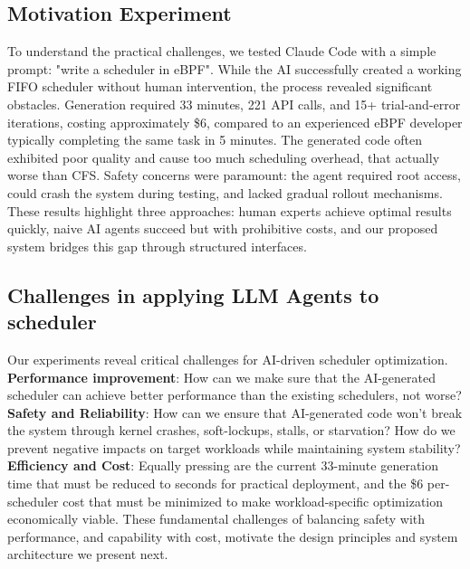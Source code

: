 \subsection{Motivation Experiment}

To understand the practical challenges, we tested Claude Code with a simple prompt: "write a scheduler in eBPF". While the AI successfully created a working FIFO scheduler without human intervention, the process revealed significant obstacles. Generation required 33 minutes, 221 API calls, and 15+ trial-and-error iterations, costing approximately \$6, compared to an experienced eBPF developer typically completing the same task in 5 minutes. The generated code often exhibited poor quality and cause too much scheduling overhead, that actually worse than CFS. Safety concerns were paramount: the agent required root access, could crash the system during testing, and lacked gradual rollout mechanisms. These results highlight three approaches: human experts achieve optimal results quickly, naive AI agents succeed but with prohibitive costs, and our proposed system bridges this gap through structured interfaces.

\subsection{Challenges in applying LLM Agents to scheduler}

Our experiments reveal critical challenges for AI-driven scheduler optimization. \textbf{Performance improvement}: How can we make sure that the AI-generated scheduler can achieve better performance than the existing schedulers, not worse? \textbf{Safety and Reliability}: How can we ensure that AI-generated code won't break the system through kernel crashes, soft-lockups, stalls, or starvation? How do we prevent negative impacts on target workloads while maintaining system stability? \textbf{Efficiency and Cost}: Equally pressing are the current 33-minute generation time that must be reduced to seconds for practical deployment, and the \$6 per-scheduler cost that must be minimized to make workload-specific optimization economically viable. These fundamental challenges of balancing safety with performance, and capability with cost, motivate the design principles and system architecture we present next.